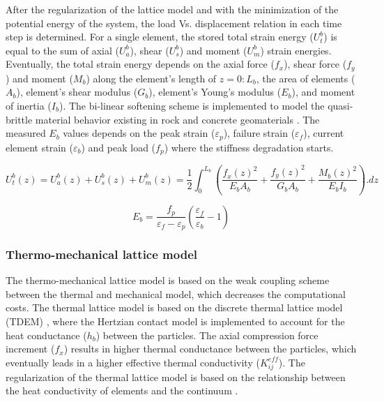 After the regularization of the lattice model and with the minimization of the potential energy of the system, the load Vs. displacement relation in each time step is determined. For a single element, the stored total strain energy ($U_t^b$) is equal to the sum of axial ($U_a^b$), shear ($U_s^b$) and moment ($U_m^b$) strain energies. Eventually, the total strain energy depends on the axial force ($f_x$), shear force ($f_y$) and moment ($M_b$) along the element's length of $z=0:L_b$, the area of elements ($A_b$), element's shear modulus ($G_b$), element's Young's modulus ($E_b$), and moment of inertia ($I_b$). The bi-linear softening scheme is implemented to model the quasi-brittle material behavior existing in rock and concrete geomaterials \cite{Inceetal2003}. The measured $E_b$ values depends on the peak strain ($\varepsilon_p$), failure  strain ($\varepsilon_f$), current element strain ($\varepsilon_b$) and peak load ($f_p$) where the stiffness degradation starts.

\begin{equation}
\label{eq:LEM_Mechanical_8}
 U_t^b(z)=U_a^b(z)+U_s^b(z)+U_m^b(z)=\frac{1}{2}\int_{0}^{L_b}{\left(\frac{f_x{(z)}^2}{E_b A_b}+\frac{f_y{(z)}^2}{G_b A_b}+\frac{M_b{(z)}^2}{E_b I_b}\right).dz} 
\end{equation}

\begin{equation}
\label{eq:LEM_Mechanical_9}
E_b=\frac{f_p}{\varepsilon_f-\varepsilon_p}\left(\frac{\varepsilon_f}{\varepsilon_b}-1\right)
\end{equation}


\subsubsection*{Thermo-mechanical lattice model}

The thermo-mechanical lattice model is based on the weak coupling scheme between the thermal and mechanical model, which decreases the computational costs. The thermal lattice model is based on the discrete thermal lattice model (TDEM) \cite{Zhangetal2011, Fengetal2008}, where the Hertzian contact model is implemented to account for the heat conductance ($h_b$) between the particles. The axial compression force increment ($f_x$) results in higher thermal conductance between the particles, which eventually leads in a higher effective thermal conductivity ($K_{ij}^{eff}$). The regularization of the thermal lattice model is based on the relationship between the heat conductivity of elements and the continuum \cite{Rizvietal2018b}. 


